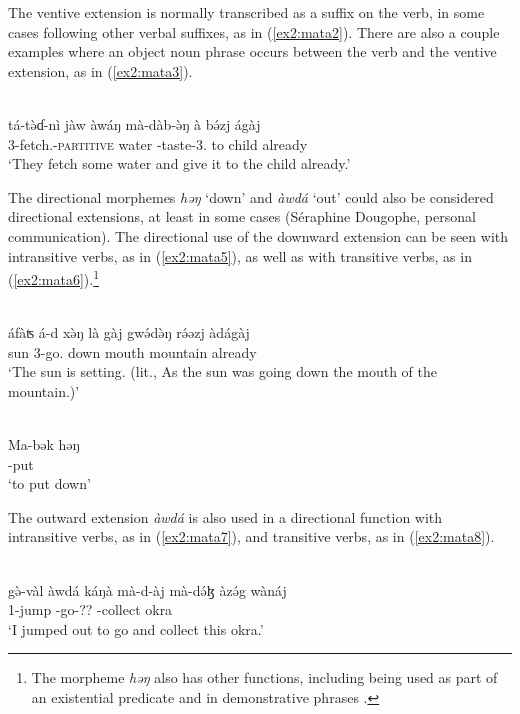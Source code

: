 The ventive extension is normally transcribed as a suffix on the verb, in some cases following other verbal suffixes, as in (\ref{ex2:mata2}). There are also a couple examples where an object noun phrase occurs between the verb and the ventive extension, as in (\ref{ex2:mata3}). 

\ea\label{ex2:mata3}
 \\
\gll tá-tə̀ɗ-nì jàw àwáŋ mà-dàb-ə̀ŋ à bə́zj ágàj	\\
3-fetch.-\textsc{partitive} water  -taste-3. to child already		\\
\glt `They fetch some water and give it to the child already.'
\z 

The directional morphemes \textit{həŋ} `down' and \textit{àwdá} `out' could also be considered directional extensions, at least in some cases (Séraphine Dougophe, personal communication). The directional use of the downward extension can be seen with intransitive verbs, as in (\ref{ex2:mata5}), as well as with transitive verbs, as in (\ref{ex2:mata6}).\footnote{The morpheme \textit{həŋ} also has other functions, including being used as part of an existential predicate and in demonstrative phrases \citep[39, 95, 157]{dougopheGrammarMatal2021}.} 

\ea\label{ex2:mata5}
 \\
\gll áfàʦ á-d xə̀ŋ là gàj gwə́də̀ŋ rə́əzj àdágàj \\
sun 3-go. down  mouth mountain  already \\ 
\glt `The sun is setting. (lit., As the sun was going down the mouth of the mountain.)'

\ex\label{ex2:mata6}
 \\
\gll Ma-bək həŋ	\\
-put 	\\
\glt `to put down'
\z 

The outward extension \textit{àwdá} is also used in a directional function with intransitive verbs, as in (\ref{ex2:mata7}), and transitive verbs, as in (\ref{ex2:mata8}). 

\ea\label{ex2:mata7}
 \\
\gll gə̀-vàl àwdá káŋà mà-d-àj mà-də́ɮ àzə́g wànáj	\\
1-jump   -go-?? -collect okra 	\\
\glt `I jumped out to go and collect this okra.'


